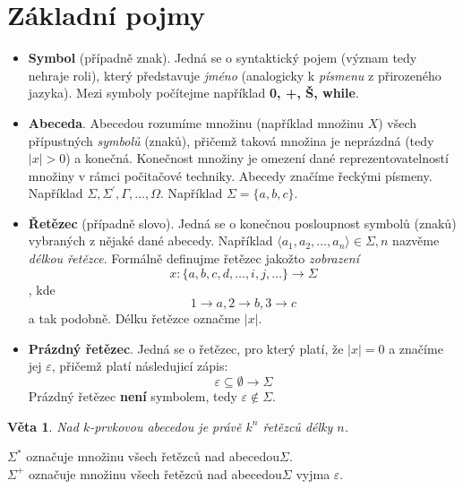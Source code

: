 \documentclass[10pt, a4paper, titlepage]{article}
\theoremstyle{note}
\newtheorem{veta}{\textbf{Věta}}
\begin{document}
\section{Základní pojmy}
\begin{itemize}
\item
\textbf{Symbol} (případně znak). Jedná se o syntaktický pojem (význam tedy nehraje roli), který představuje \emph{jméno} (analogicky k \emph{písmenu} z přirozeného jazyka).
Mezi symboly počítejme například \textbf{0, +, Š, while}.

\item
\textbf{Abeceda}. Abecedou rozumíme množinu (například množinu $X$) všech přípustných \emph{symbolů} (znaků), přičemž taková množina je neprázdná (tedy $|x|>0$) a konečná.
Konečnost množiny je omezení dané reprezentovatelností množiny v rámci počitačové techniky.
Abecedy značíme řeckými písmeny. Například $\Sigma, \Sigma^{'}, \Gamma, \ldots, \Omega$.
Například $\Sigma = \lbrace a, b, c \rbrace$.

\item
\textbf{Řetězec} (případně slovo). Jedná se o konečnou posloupnost symbolů (znaků) vybraných z nějaké dané abecedy.
Například $\langle a_{1}, a_{2}, \ldots, a_{n} \rangle \in \Sigma, n$ nazvěme \emph{délkou řetězce}.
Formálně definujme řetězec jakožto \emph{zobrazení}
$$
x : \lbrace a, b, c, d, \ldots, i, j, \ldots \rbrace \rightarrow \Sigma
$$
, kde
$$
1 \rightarrow a, 2 \rightarrow b, 3 \rightarrow c
$$ a tak podobně.
Délku řetězce označme $|x|$.

\item
\textbf{Prázdný řetězec}. Jedná se o řetězec, pro který platí, že $|x| = 0$ a značíme jej $\varepsilon$, přičemž platí následujicí zápis:
$$
\varepsilon \subseteq \emptyset \rightarrow \Sigma
$$
Prázdný řetězec \textbf{není} symbolem, tedy $\varepsilon \notin \Sigma$.
\end{itemize}

\begin{veta}
Nad $k$-prvkovou abecedou je právě $k^{n}$ řetězců délky $n$.
\end{veta}

\noindent
$\Sigma^{*}$ označuje množinu všech řetězců nad abecedou$\Sigma$. \\
$\Sigma^{+}$ označuje množinu všech řetězců nad abecedou$\Sigma$ vyjma $\varepsilon$.
\end{document}
